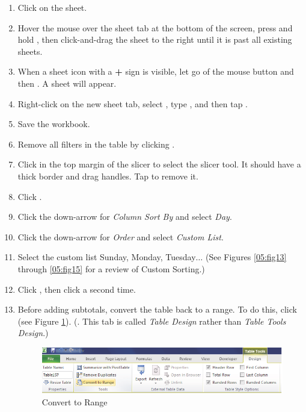 \begin{enumbox}
	\begin{enumerate}
		\item Click on the  sheet.
		\item Hover the mouse over the  sheet tab at the bottom of the screen, press and hold , then click-and-drag the sheet to the right until it is past all existing sheets.
		\item When a sheet icon with a \textbf{+} sign is visible, let go of the mouse button and then . A  sheet will appear.
		\item Right-click on the new sheet tab, select , type , and then tap .
		\item Save the  workbook.
		\item Remove all filters in the table by clicking .
		\item Click in the top margin of the slicer to select the slicer tool. It should have a thick border and drag handles. Tap  to remove it.
	
		\item Click . 
		\item Click the down-arrow for \textit{Column Sort By} and select \textit{Day}.
		\item Click the down-arrow for \textit{Order} and select \textit{Custom List}.
		\item Select the custom list Sunday, Monday, Tuesday$\ldots$ (See Figures \ref{05:fig13} through \ref{05:fig15} for a review of Custom Sorting.)
		\item Click , then click  a second time.
		\item Before adding subtotals, convert the table back to a range. To do this, click  (see Figure \ref{05:fig23}). (. This tab is called \textit{Table Design} rather than \textit{Table Tools Design}.)

		\begin{figure}[H]
			\centering
			\includegraphics[width=\maxwidth{.95\linewidth}]{gfx/ch05_fig23}
			\caption{Convert to Range}
			\label{05:fig23}
		\end{figure}


\end{enumerate}
\end{enumbox}
